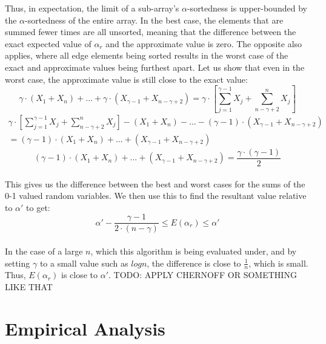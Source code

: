 \documentclass{article}
\begin{document}
Thus, in expectation, the limit of a sub-array's $\alpha$-sortedness is upper-bounded by the $\alpha$-sortedness of the entire array. In the best case, the elements that are summed fewer times are all unsorted, meaning that the difference between the exact expected value of $\alpha_{r}$ and the approximate value is zero.
The opposite also applies, where all edge elements being sorted results in the worst case of the exact and approximate values being furthest apart. Let us show that even in the worst case, the approximate value is still close to the exact value:
\begin{equation*}
\gamma \cdot (X_{1} + X_{n}) + ... + \gamma \cdot (X_{\gamma - 1} + X_{n - \gamma + 2}) = \gamma \cdot \left[ \sum_{j = 1}^{\gamma - 1} X_{j} + \sum_{n - \gamma + 2}^{n} X_{j}  \right]
\end{equation*}
\begin{multline*}
\gamma \cdot \left[ \sum_{j = 1}^{\gamma - 1} X_{j} + \sum_{n - \gamma + 2}^{n} X_{j}  \right] - (X_{1} + X_{n}) - ... - (\gamma - 1) \cdot (X_{\gamma - 1} + X_{n - \gamma + 2}) \\
= (\gamma - 1) \cdot (X_{1} + X_{n}) + ... + (X_{\gamma - 1} + X_{n - \gamma + 2})
\end{multline*}
\begin{equation*}
(\gamma - 1) \cdot (X_{1} + X_{n}) + ... + (X_{\gamma - 1} + X_{n - \gamma + 2}) = \frac{\gamma \cdot (\gamma - 1)}{2}
\end{equation*}
\paragraph{}This gives us the difference between the best and worst cases for the sums of the 0-1 valued random variables. We then use this to find the resultant value relative to $\alpha'$ to get:
\begin{equation*}
\alpha' - \frac{\gamma - 1}{2 \cdot (n - \gamma)} \leq E(\alpha_{r}) \leq \alpha'
\end{equation*}
\paragraph{}In the case of a large $n$, which this algorithm is being evaluated under, and by setting $\gamma$ to a small value such as $logn$, the difference is close to $\frac{1}{n}$, which is small. Thus, $E(\alpha_{r})$ is close to $\alpha'$. TODO: APPLY CHERNOFF OR SOMETHING LIKE THAT
\section{Empirical Analysis}
\end{document}
